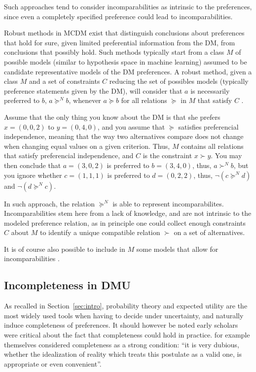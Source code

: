 \documentclass[french, english]{llncs}
\begin{document}
Such approaches tend to consider incomparabilities as intrinsic to the preferences, since even a completely specified preference could lead to incomparabilities. 

Robust methods in MCDM exist that distinguish conclusions about preferences that hold for sure, given limited preferential information from the \ac{DM}, from conclusions that possibly hold. Such methods typically start from a class $M$ of possible models (similar to hypothesis space in machine learning) assumed to be candidate representative models of the \ac{DM} preferences. A robust method, given a class $M$ and a set of constraints $C$ reducing the set of possibles models (typically preference statements given by the \ac{DM}), will consider that $a$ is necessarily preferred to $b$, $a \succeq^N b$, whenever $a \succeq b$ for all relations $\succeq$ in $M$ that satisfy $C$ \citep{greco_ordinal_2008}.
\begin{example} 
Assume that the only thing you know about the \ac{DM} is that she prefers $x = (0, 0, 2)$ to $y = (0, 4, 0)$, and you assume that $\succeq$ satisfies preferencial independence, meaning that the way two alternatives compare does not change when changing equal values on a given criterion. Thus, $M$ contains all relations that satisfy preferencial independence, and $C$ is the constraint $x \succ y$. You may then conclude that $a = (3, 0, 2)$ is preferred to $b = (3, 4, 0)$, thus, $a \succ^N b$, but you ignore whether $c = (1, 1, 1)$ is preferred to $d = (0, 2, 2)$, thus, $¬(c \succeq^N d)$ and $¬(d \succeq^N c)$.
\end{example} 
In such approach, the relation $\succeq^N$ is able to represent incomparabilites. Incomparabilities stem here from a lack of knowledge, and are not intrinsic to the modeled preference relation, as in principle one could collect enough constraints $C$ about $M$ to identify a unique compatible relation $\succ$ on a set of alternatives.

It is of course also possible to include in $M$ some models that allow for incomparabilities \citep{greco_electregkms:_2011}.

\subsection{Incompleteness in DMU}

As recalled in Section~\ref{sec:intro}, probability theory and expected utility are the most widely used tools when having to decide under uncertainty, and naturally induce completeness of preferences. It should however be noted early scholars were critical about the fact that completeness could hold in practice. 
\citet[p. 630]{von_neumann_theory_1953} for example themselves considered completeness as a strong condition: “it is very dubious, whether the idealization of reality which treats this postulate as a valid one, is appropriate or even convenient”.
\end{document}
